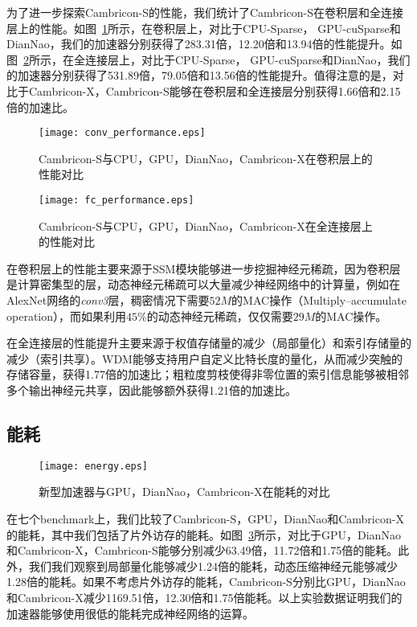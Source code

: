 为了进一步探索Cambricon-S的性能，我们统计了Cambricon-S在卷积层和全连接层上的性能。如图~\ref{fig:conv_performance}所示，在卷积层上，对比于CPU-Sparse， GPU-cuSparse和DianNao，我们的加速器分别获得了283.31倍，12.20倍和13.94倍的性能提升。如图~\ref{fig:fc_performance}所示，在全连接层上，对比于CPU-Sparse， GPU-cuSparse和DianNao，我们的加速器分别获得了531.89倍，79.05倍和13.56倍的性能提升。值得注意的是，对比于Cambricon-X，Cambricon-S能够在卷积层和全连接层分别获得1.66倍和2.15倍的加速比。

\begin{figure}[h]
\centering
\texttt{[image: conv\_performance.eps]}
\caption{Cambricon-S与CPU，GPU，DianNao，Cambricon-X在卷积层上的性能对比}
\label{fig:conv_performance}
\end{figure}

\begin{figure}[h]
\centering
\texttt{[image: fc\_performance.eps]}
\caption{Cambricon-S与CPU，GPU，DianNao，Cambricon-X在全连接层上的性能对比}
\label{fig:fc_performance}
\end{figure}


在卷积层上的性能主要来源于SSM模块能够进一步挖掘神经元稀疏，因为卷积层是计算密集型的层，动态神经元稀疏可以大量减少神经网络中的计算量，例如在AlexNet网络的\emph{conv3}层，稠密情况下需要$52M$的MAC操作（Multiply–accumulate operation），而如果利用$45\%$的动态神经元稀疏，仅仅需要$29M$的MAC操作。

在全连接层的性能提升主要来源于权值存储量的减少（局部量化）和索引存储量的减少（索引共享）。WDM能够支持用户自定义比特长度的量化，从而减少突触的存储容量，获得1.77倍的加速比；粗粒度剪枝使得非零位置的索引信息能够被相邻多个输出神经元共享，因此能够额外获得1.21倍的加速比。


\subsection{能耗}
\begin{figure}[h]
\centering
\texttt{[image: energy.eps]}
\caption{新型加速器与GPU，DianNao，Cambricon-X在能耗的对比}
\label{fig:energy}
\end{figure}

在七个benchmark上，我们比较了Cambricon-S，GPU，DianNao和Cambricon-X的能耗，其中我们包括了片外访存的能耗。如图~\ref{fig:energy}所示，对比于GPU，DianNao和Cambricon-X，Cambricon-S能够分别减少63.49倍，11.72倍和1.75倍的能耗。此外，我们我们观察到局部量化能够减少1.24倍的能耗，动态压缩神经元能够减少1.28倍的能耗。如果不考虑片外访存的能耗，Cambricon-S分别比GPU，DianNao和Cambricon-X减少1169.51倍，12.30倍和1.75倍能耗。以上实验数据证明我们的加速器能够使用很低的能耗完成神经网络的运算。


